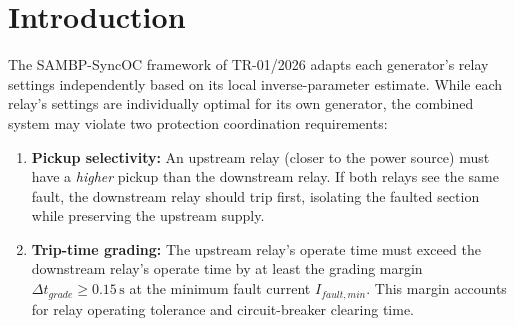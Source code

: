 \documentclass[12pt,a4paper]{article}
\theoremstyle{definition}
\theoremstyle{plain}
\begin{document}
\begin{abstract}
Independent per-generator relay adaptation without coordination can violate
selectivity: an upstream relay may trip faster than its downstream counterpart,
causing unnecessary loss of service to healthy loads.
This report presents Milestone~4 of SAMBP-SyncOC: a greedy cascade
coordination algorithm that enforces pickup selectivity
($\Delta I_m \geq 0.20\,\text{pu}$) and IEC~60255 trip-time grading
($\Delta t_{grade} \geq 0.15\,\text{s}$) across all generator relays and the
downstream bus relay, after the per-generator adaptive mapping has produced
an initial set of adaptive settings.
The algorithm is validated on $N \in \{2, 3, 4\}$ generators under 3PH
faults and $N = 3$ generators under an LL fault.  In all 3PH cases, both
constraints are satisfied after coordination (starting from violations in both);
in the LL case, adaptation is rejected for all generators ($\gamma < 0.70$)
and the cascade operates on fixed commissioning settings, demonstrating graceful
degradation.  Convergence is achieved in a single forward pass for all tested
cases.

\medskip
\noindent\textbf{Keywords:} relay coordination, selectivity, time grading,
greedy cascade, multi-generator, adaptive overcurrent, SAMBP-SyncOC.
\end{abstract}

\tableofcontents
\listoffigures
\listoftables
\newpage

\section{Introduction}
\label{sec:intro}

The SAMBP-SyncOC framework of TR-01/2026 adapts each generator's relay
settings independently based on its local inverse-parameter estimate.
While each relay's settings are individually optimal for its own generator,
the combined system may violate two protection coordination requirements:

\begin{enumerate}
  \item \textbf{Pickup selectivity:} An upstream relay (closer to the power
        source) must have a \emph{higher} pickup than the downstream relay.
        If both relays see the same fault, the downstream relay should trip
        first, isolating the faulted section while preserving the upstream
        supply.
  \item \textbf{Trip-time grading:} The upstream relay's operate time must
        exceed the downstream relay's operate time by at least the grading
        margin $\Delta t_{grade} \geq 0.15\,\text{s}$ at the minimum fault
        current $I_{fault,min}$.  This margin accounts for relay operating
        tolerance and circuit-breaker clearing time.
\end{enumerate}
\end{document}
